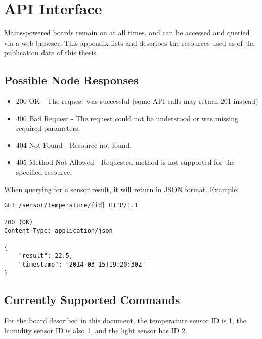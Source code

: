 \chapter{API Interface}

Mains-powered boards remain on at all times, and can be accessed and queried via a web browser. This appendix lists and describes the resources used as of the publication date of this thesis.

\section*{Possible Node Responses}
\begin{itemize}
\item 200 OK - The request was successful (some API calls may return 201 instead)
\item 400 Bad Request - The request could not be understood or was missing required parameters.
\item 404 Not Found - Resource not found.
\item 405 Method Not Allowed - Requested method is not supported for the specified resource.
\end{itemize}

When querying for a sensor result, it will return in JSON format. Example:

\begin{lstlisting}
GET /sensor/temperature/{id} HTTP/1.1

200 (OK)
Content-Type: application/json

{
	"result": 22.5,
	"timestamp": "2014-03-15T19:20:30Z"
}
\end{lstlisting}

\section*{Currently Supported Commands}

For the board described in this document, the temperature sensor ID is 1, the humidity sensor ID is also 1, and the light sensor has ID 2.

